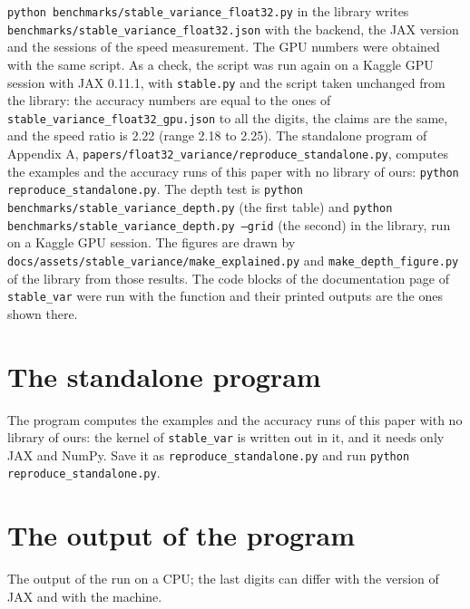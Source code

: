 \documentclass[11pt]{article}
\begin{document}
\texttt{python benchmarks/stable\_variance\_float32.py} in the library writes \texttt{benchmarks/stable\_variance\_float32.json} with the backend, the JAX version and the sessions of the speed measurement. The GPU numbers were obtained with the same script. As a check, the script was run again on a Kaggle GPU session with JAX 0.11.1, with \texttt{stable.py} and the script taken unchanged from the library: the accuracy numbers are equal to the ones of \texttt{stable\_variance\_float32\_gpu.json} to all the digits, the claims are the same, and the speed ratio is 2.22 (range 2.18 to 2.25). The standalone program of Appendix A, \texttt{papers/float32\_variance/reproduce\_standalone.py}, computes the examples and the accuracy runs of this paper with no library of ours: \texttt{python reproduce\_standalone.py}. The depth test is \texttt{python benchmarks/stable\_variance\_depth.py} (the first table) and \texttt{python benchmarks/stable\_variance\_depth.py --grid} (the second) in the library, run on a Kaggle GPU session. The figures are drawn by \texttt{docs/assets/stable\_variance/make\_explained.py} and \texttt{make\_depth\_figure.py} of the library from those results. The code blocks of the documentation page of \texttt{stable\_var} were run with the function and their printed outputs are the ones shown there.

\appendix
\section{The standalone program}

The program computes the examples and the accuracy runs of this paper with no library of ours: the kernel of \texttt{stable\_var} is written out in it, and it needs only JAX and NumPy. Save it as \texttt{reproduce\_standalone.py} and run \texttt{python reproduce\_standalone.py}.



\section{The output of the program}

The output of the run on a CPU; the last digits can differ with the version of JAX and with the machine.





\end{document}
